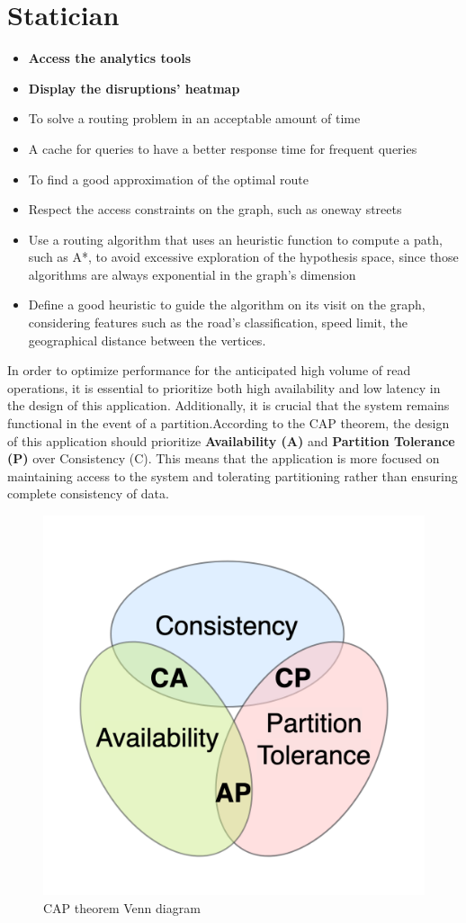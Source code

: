 \section{Statician}
\begin{itemize}
	\item \textbf{Access the analytics tools}
	\item \textbf{Display the disruptions' heatmap}
\end{itemize}

	\begin{itemize}
	\item To solve a routing problem in an acceptable amount of time
	\item A cache for queries to have a better response time for frequent queries
	\item To find a good approximation of the optimal route
	\item Respect the access constraints on the graph, such as oneway streets
	\item Use a routing algorithm that uses an heuristic function to compute a path, such as A*, to avoid excessive exploration of the hypothesis space, since those algorithms are always exponential in the graph’s dimension
	\item Define a good heuristic to guide the algorithm on its visit on the graph, considering features such as the road’s classification, speed limit, the geographical distance between the vertices.
	\end{itemize}


In order to optimize performance for the anticipated high volume of read operations, it is essential to prioritize both high availability and low latency in the design of this application. Additionally, it is crucial that the system remains functional in the event of a partition.According to the CAP theorem, the design of this application should prioritize \textbf{Availability (A)} and \textbf{Partition Tolerance (P)} over Consistency (C). This means that the application is more focused on maintaining access to the system and tolerating partitioning rather than ensuring complete consistency of data.
\begin{figure}[H]
	\centering
	\includegraphics[width=0.4\linewidth]{assets/CAP_Theorem_Venn_Diagram}
	\caption{CAP theorem Venn diagram}
	\label{fig:captheoremvenndiagram}
\end{figure}







